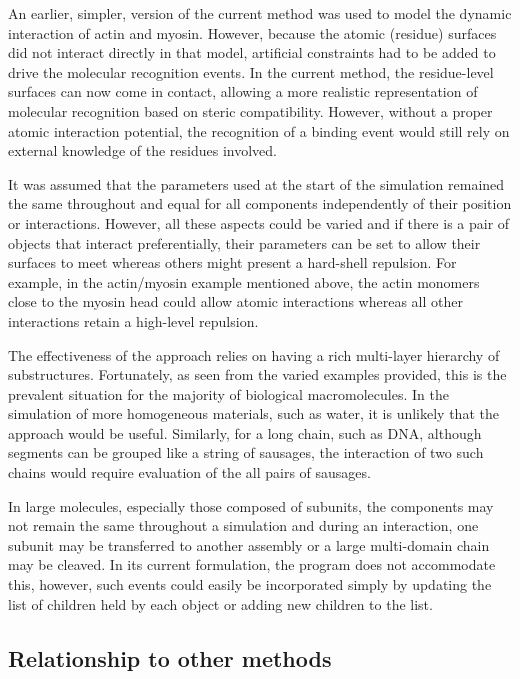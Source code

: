 \documentclass[review]{elsarticle}
\begin{document}
{{{{{An earlier, simpler, version of the current method was used to model the
dynamic interaction of actin and myosin.   However, because the atomic (residue)
surfaces did not interact directly in that model, artificial constraints had
to be added to drive the molecular recognition events.  In the current
method, the residue-level surfaces can now come in contact, allowing a more
realistic representation of molecular recognition based on steric compatibility.
However, without a proper atomic interaction potential, the recognition of 
a binding event would still rely on external knowledge of the residues involved.

It was assumed that the parameters used at the start of the simulation remained
the same throughout and equal for all components independently of their
position or interactions.   However, all these aspects could be varied and
if there is a pair of objects that interact preferentially, their parameters
can be set to allow their surfaces to meet whereas others might present a
hard-shell repulsion.  For example, in the actin/myosin example mentioned
above, the actin monomers close to the myosin head could allow atomic
interactions whereas all other interactions retain a high-level repulsion.

The effectiveness of the approach relies on having a rich multi-layer
hierarchy of substructures.   Fortunately, as seen from the varied examples
provided, this is the prevalent situation for the majority of biological
macromolecules.   In the simulation of more homogeneous materials, such
as water, it is unlikely that the approach would be useful.  Similarly, for
a long chain, such as DNA, although segments can be grouped like a string
of sausages, the interaction of two such chains would require evaluation
of the all pairs of sausages.

In large molecules, especially those composed of subunits, the components may not
remain the same throughout a simulation and during an interaction, one subunit may
be transferred to another assembly or a large multi-domain chain may be cleaved.
In its current formulation, the program does not accommodate this, however, such
events could easily be incorporated simply by updating the list of children held
by each object or adding new children to the list. 

\subsection{Relationship to other methods}

}}}}}
\end{document}
